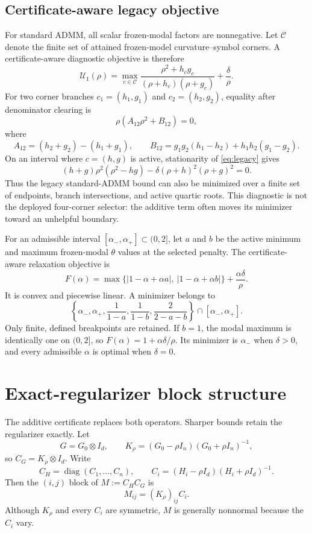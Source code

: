\documentclass[11pt]{article}
\newcommand{\diag}{\operatorname{diag}}
\begin{document}
\subsection{Certificate-aware legacy objective}
For standard ADMM, all scalar frozen-modal factors are nonnegative. Let
$\mathcal C$ denote the finite set of attained frozen-model curvature--symbol
corners. A certificate-aware diagnostic objective is therefore
\begin{equation}
\mathcal U_1(\rho)=
\max_{c\in\mathcal C}
\frac{\rho^2+h_cg_c}{(\rho+h_c)(\rho+g_c)}
+\frac{\delta}{\rho}.
\label{eq:legacy}
\end{equation}
For two corner branches $c_1=(h_1,g_1)$ and $c_2=(h_2,g_2)$, equality after
denominator clearing is
\[
\rho(A_{12}\rho^2+B_{12})=0,
\]
where
\[
A_{12}=(h_2+g_2)-(h_1+g_1),\qquad
B_{12}=g_1g_2(h_1-h_2)+h_1h_2(g_1-g_2).
\]
On an interval where $c=(h,g)$ is active, stationarity of
\eqref{eq:legacy} gives
\begin{equation}
(h+g)\rho^2(\rho^2-hg)
-\delta(\rho+h)^2(\rho+g)^2=0.
\label{eq:quartic}
\end{equation}
Thus the legacy standard-ADMM bound can also be minimized over a finite set of
endpoints, branch intersections, and active quartic roots. This diagnostic is
not the deployed four-corner selector: the additive term often moves its
minimizer toward an unhelpful boundary.

For an admissible interval
$[\alpha_-,\alpha_+]\subset(0,2]$, let $a$ and $b$ be the active minimum and
maximum frozen-modal $\theta$ values at the selected penalty. The
certificate-aware relaxation objective is
\[
F(\alpha)=
\max\{|1-\alpha+\alpha a|,\ |1-\alpha+\alpha b|\}
+\frac{\alpha\delta}{\rho}.
\]
It is convex and piecewise linear. A minimizer belongs to
\[
\left\{
\alpha_-,\alpha_+,\frac{1}{1-a},\frac{1}{1-b},
\frac{2}{2-a-b}
\right\}\cap[\alpha_-,\alpha_+].
\]
Only finite, defined breakpoints are retained. If $b=1$, the modal maximum is
identically one on $(0,2]$, so
$F(\alpha)=1+\alpha\delta/\rho$. Its minimizer is $\alpha_-$ when
$\delta>0$, and every admissible $\alpha$ is optimal when $\delta=0$.

\section{Exact-regularizer block structure}\label{sec:block}
The additive certificate replaces both operators. Sharper bounds retain the
regularizer exactly. Let
\[
G=G_0\otimes I_d,\qquad
K_\rho=(G_0-\rho I_n)(G_0+\rho I_n)^{-1},
\]
so $C_G=K_\rho\otimes I_d$. Write
\[
C_H=\diag(C_1,\ldots,C_n),\qquad
C_i=(H_i-\rho I_d)(H_i+\rho I_d)^{-1}.
\]
Then the $(i,j)$ block of $M:=C_HC_G$ is
\begin{equation}
M_{ij}=(K_\rho)_{ij}C_i.
\label{eq:block_M}
\end{equation}
Although $K_\rho$ and every $C_i$ are symmetric, $M$ is generally nonnormal
because the $C_i$ vary.
\end{document}
